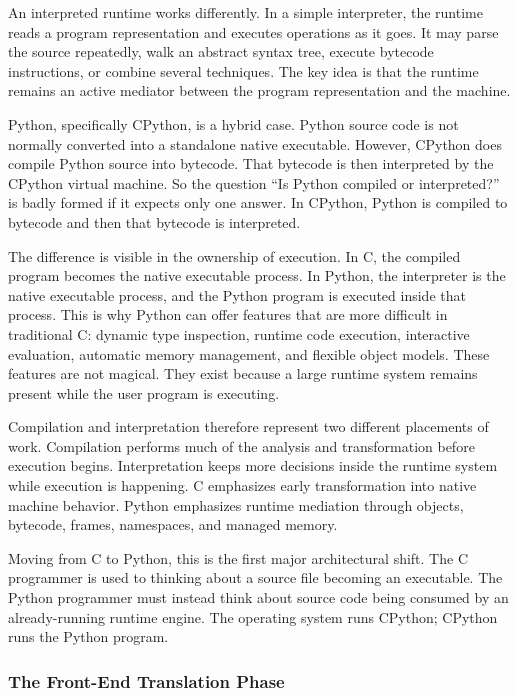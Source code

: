 An interpreted runtime works differently. In a simple interpreter, the runtime reads a program representation and executes operations as it goes. It may parse the source repeatedly, walk an abstract syntax tree, execute bytecode instructions, or combine several techniques. The key idea is that the runtime remains an active mediator between the program representation and the machine.

Python, specifically CPython, is a hybrid case. Python source code is not normally converted into a standalone native executable. However, CPython does compile Python source into bytecode. That bytecode is then interpreted by the CPython virtual machine. So the question ``Is Python compiled or interpreted?'' is badly formed if it expects only one answer. In CPython, Python is compiled to bytecode and then that bytecode is interpreted.

The difference is visible in the ownership of execution. In C, the compiled program becomes the native executable process. In Python, the interpreter is the native executable process, and the Python program is executed inside that process. This is why Python can offer features that are more difficult in traditional C: dynamic type inspection, runtime code execution, interactive evaluation, automatic memory management, and flexible object models. These features are not magical. They exist because a large runtime system remains present while the user program is executing.

Compilation and interpretation therefore represent two different placements of work. Compilation performs much of the analysis and transformation before execution begins. Interpretation keeps more decisions inside the runtime system while execution is happening. C emphasizes early transformation into native machine behavior. Python emphasizes runtime mediation through objects, bytecode, frames, namespaces, and managed memory.

Moving from C to Python, this is the first major architectural shift. The C programmer is used to thinking about a source file becoming an executable. The Python programmer must instead think about source code being consumed by an already-running runtime engine. The operating system runs CPython; CPython runs the Python program.


\subsubsection{The Front-End Translation Phase}


